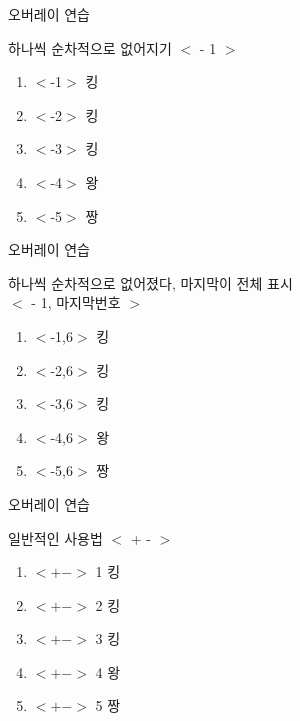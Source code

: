 \documentclass[10pt,xcolor=pdftex,dvipsnames,table,handout]{beamer}
\begin{document}
		\begin{frame}[t]{오버레이 연습}

			\begin{block} {하나씩 순차적으로 없어지기 $<$ - 1 $>$}
			\begin{enumerate}
			\item <-1> $<$-1$>$ 킹
			\item <-2> $<$-2$>$ 킹
			\item <-3> $<$-3$>$ 킹
			\item <-4> $<$-4$>$ 왕
			\item <-5> $<$-5$>$ 짱
			\end{enumerate}
			\end{block}

		\end{frame}

		\begin{frame}[t]{오버레이 연습}

			\begin{block} {하나씩 순차적으로 없어졌다, 마지막이 전체 표시\\
						 $<$ - 1, 마지막번호 $>$}
			\begin{enumerate}
			\item <-1,6> $<$-1,6$>$ 킹
			\item <-2,6> $<$-2,6$>$ 킹
			\item <-3,6> $<$-3,6$>$ 킹
			\item <-4,6> $<$-4,6$>$ 왕
			\item <-5,6> $<$-5,6$>$ 짱
			\end{enumerate}
			\end{block}

		\end{frame}



		\begin{frame}[t]{오버레이 연습 }

			\begin{block} {일반적인 사용법 $<$ + - $>$}
			\begin{enumerate}
			\item <+-> $<+->$ 1 킹
			\item <+-> $<+->$ 2 킹
			\item <+-> $<+->$ 3 킹
			\item <+-> $<+->$ 4 왕
			\item <+-> $<+->$ 5 짱
			\end{enumerate}
			\end{block}

		\end{frame}
\end{document}
